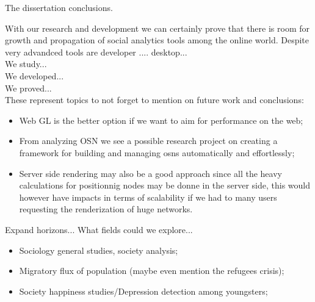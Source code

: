 The dissertation conclusions.

With our research and development we can certainly prove that there is room for growth and propagation of social analytics tools among the online world. Despite very advandced tools are developer .... desktop...
\\
We study...\\
We developed...\\
We proved...\\

These represent topics to not forget to mention on future work and conclusions:
\begin{itemize}
    \item Web GL is the better option if we want to aim for performance on the web;
    \item From analyzing OSN we see a possible research project on creating a framework for building
    and managing \glspl{osn} automatically and effortlessly;
    \item Server side rendering may also be a good approach since all the heavy calculations for positionnig nodes
    may be donne in the server side, this would however have impacts in terms of scalability if we had to many users requesting
    the renderization of huge networks.
\end{itemize}

Expand horizons... What fields could we explore...\\
\begin{itemize}
    \item Sociology general studies, society analysis;
    \item Migratory flux of population (maybe even mention the refugees crisis);
    \item Society happiness studies/Depression detection among youngsters;
\end{itemize}
